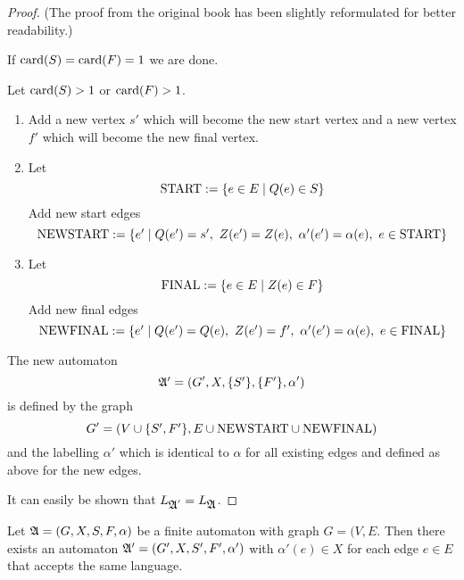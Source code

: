 \begin{proof}
(The proof from the original book has been slightly reformulated for better
readability.)

If $\mathrm{card}({S}) = \mathrm{card}({F}) = 1$ we are done.

Let $\mathrm{card}({S}) > 1$ or $\mathrm{card}({F}) > 1$.

\newcommand{\startedges}{\mathrm{START}}
\newcommand{\newstartedges}{\mathrm{NEWSTART}}
\newcommand{\finaledges}{\mathrm{FINAL}}
\newcommand{\newfinaledges}{\mathrm{NEWFINAL}}
\begin{enumerate}
  \item Add a new vertex $s'$ which will become the new start vertex and a new 
  vertex $f'$ which will become the new final vertex.
  
  \item Let	\[ \startedges := \setof{e \in E \mid Q(e) \in S} \]
	Add new start edges 
	\[ \newstartedges := \setof{e' \mid Q(e') = s',\ Z(e') = Z(e),\ \alpha'(e') =
	\alpha(e),\ e \in \startedges} \]

	\item	Let	\[ \finaledges := \setof{e \in E \mid Z(e) \in F} \]
	Add new final edges
	\[ \newfinaledges := \setof{e' \mid Q(e') = Q(e),\ Z(e') = f',\ \alpha'(e') =
	\alpha(e),\ e \in \finaledges} \]
\end{enumerate}

The new automaton 
\[ \mbox{$\mathfrak{A'}$} = (G', X, \mbox{$\{S'\}$}, \mbox{$\{F'\}$}, \alpha') \]
is defined by the graph
\[ G' = (V \cup \setof{S', F'}, E \cup \newstartedges \cup \newfinaledges) \]
and the labelling $\alpha'$ which is identical to $\alpha$ for all existing 
edges and defined as above for the new edges.

It can easily be shown that $L_{\mbox{$\mathfrak{A}$}'} = L_{\mbox{$\mathfrak{A}$}}$.
\end{proof}

\bigskip
\begin{lemma}
Let $\mbox{$\mathfrak{A}$} = (G, X, S, F, \alpha)$ be a finite automaton with graph $G = (V,
E$. Then there exists an automaton $\mbox{$\mathfrak{A'}$} = (G', X, S', F', \alpha')$ with
$\alpha'(e) \in X$ for each edge $e \in E$ that accepts the same language.
\end{lemma}


